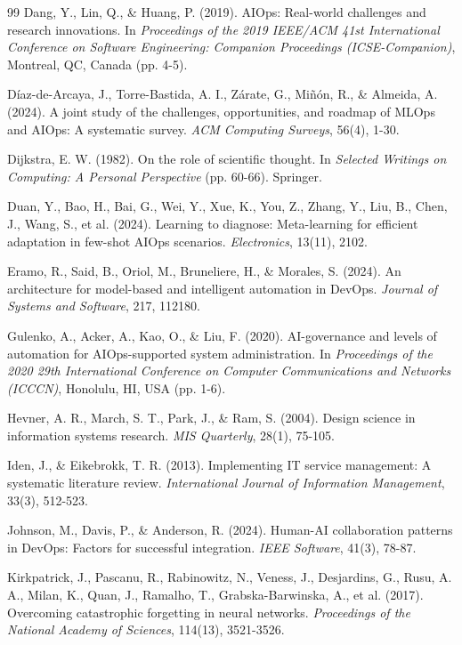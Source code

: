 \documentclass{article}
\begin{document}
\begin{thebibliography}{99}
Dang, Y., Lin, Q., \& Huang, P. (2019). AIOps: Real-world challenges and research innovations. In \textit{Proceedings of the 2019 IEEE/ACM 41st International Conference on Software Engineering: Companion Proceedings (ICSE-Companion)}, Montreal, QC, Canada (pp. 4-5).

Díaz-de-Arcaya, J., Torre-Bastida, A. I., Zárate, G., Miñón, R., \& Almeida, A. (2024). A joint study of the challenges, opportunities, and roadmap of MLOps and AIOps: A systematic survey. \textit{ACM Computing Surveys}, 56(4), 1-30.

Dijkstra, E. W. (1982). On the role of scientific thought. In \textit{Selected Writings on Computing: A Personal Perspective} (pp. 60-66). Springer.

Duan, Y., Bao, H., Bai, G., Wei, Y., Xue, K., You, Z., Zhang, Y., Liu, B., Chen, J., Wang, S., et al. (2024). Learning to diagnose: Meta-learning for efficient adaptation in few-shot AIOps scenarios. \textit{Electronics}, 13(11), 2102.

Eramo, R., Said, B., Oriol, M., Bruneliere, H., \& Morales, S. (2024). An architecture for model-based and intelligent automation in DevOps. \textit{Journal of Systems and Software}, 217, 112180.

Gulenko, A., Acker, A., Kao, O., \& Liu, F. (2020). AI-governance and levels of automation for AIOps-supported system administration. In \textit{Proceedings of the 2020 29th International Conference on Computer Communications and Networks (ICCCN)}, Honolulu, HI, USA (pp. 1-6).

Hevner, A. R., March, S. T., Park, J., \& Ram, S. (2004). Design science in information systems research. \textit{MIS Quarterly}, 28(1), 75-105.

Iden, J., \& Eikebrokk, T. R. (2013). Implementing IT service management: A systematic literature review. \textit{International Journal of Information Management}, 33(3), 512-523.

Johnson, M., Davis, P., \& Anderson, R. (2024). Human-AI collaboration patterns in DevOps: Factors for successful integration. \textit{IEEE Software}, 41(3), 78-87.

Kirkpatrick, J., Pascanu, R., Rabinowitz, N., Veness, J., Desjardins, G., Rusu, A. A., Milan, K., Quan, J., Ramalho, T., Grabska-Barwinska, A., et al. (2017). Overcoming catastrophic forgetting in neural networks. \textit{Proceedings of the National Academy of Sciences}, 114(13), 3521-3526.


\end{thebibliography}
\end{document}

